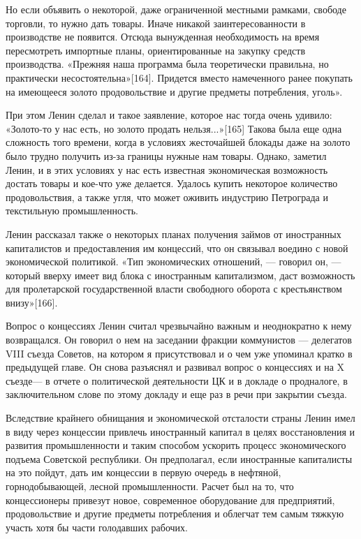\documentclass[12pt, a4paper, openany]{book}
\begin{document}
Но если объявить о некоторой, даже ограниченной местными рамками, свободе торговли, то нужно дать товары. Иначе никакой заинтересованности в производстве не появится. Отсюда вынужденная необходимость на время пересмотреть импортные планы, ориентированные на закупку средств производства. «Прежняя наша программа была теоретически правильна, но практически несостоятельна»[164]. Придется вместо намеченного ранее покупать на имеющееся золото продовольствие и другие предметы потребления, уголь».

При этом Ленин сделал и такое заявление, которое нас тогда очень удивило: «Золото-то у нас есть, но золото продать нельзя...»[165] Такова была еще одна сложность того времени, когда в условиях жесточайшей блокады даже на золото было трудно получить из-за границы нужные нам товары. Однако, заметил Ленин, и в этих условиях у нас есть известная экономическая возможность достать товары и кое-что уже делается. Удалось купить некоторое количество продовольствия, а также угля, что может оживить индустрию Петрограда и текстильную промышленность.

Ленин рассказал также о некоторых планах получения займов от иностранных капиталистов и предоставления им концессий, что он связывал воедино с новой экономической политикой. «Тип экономических отношений, — говорил он, — который вверху имеет вид блока с иностранным капитализмом, даст возможность для пролетарской государственной власти свободного оборота с крестьянством внизу»[166].

Вопрос о концессиях Ленин считал чрезвычайно важным и неоднократно к нему возвращался. Он говорил о нем на заседании фракции коммунистов — делегатов VIII съезда Советов, на котором я присутствовал и о чем уже упоминал кратко в предыдущей главе. Он снова разъяснял и развивал вопрос о концессиях и на X съезде— в отчете о политической деятельности ЦК и в докладе о продналоге, в заключительном слове по этому докладу и еще раз в речи при закрытии съезда.

Вследствие крайнего обнищания и экономической отсталости страны Ленин имел в виду через концессии привлечь иностранный капитал в целях восстановления и развития промышленности и таким способом ускорить процесс экономического подъема Советской республики. Он предполагал, если иностранные капиталисты на это пойдут, дать им концессии в первую очередь в нефтяной, горнодобывающей, лесной промышленности. Расчет был на то, что концессионеры привезут новое, современное оборудование для предприятий, продовольствие и другие предметы потребления и облегчат тем самым тяжкую участь хотя бы части голодавших рабочих.
\end{document}
